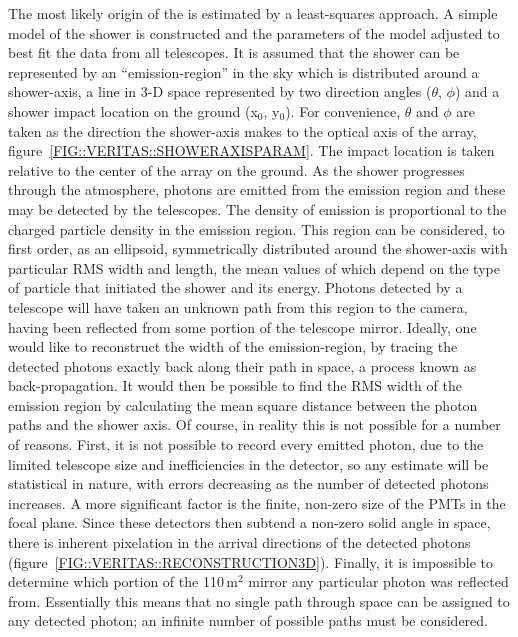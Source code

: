 The most likely origin of the \Gray is estimated by a least-squares
approach. A simple model of the shower is constructed and the
parameters of the model adjusted to best fit the data from all
telescopes. It is assumed that the shower can be represented by an
``emission-region'' in the sky which is distributed around a
shower-axis, a line in 3-D space represented by two direction angles
($\theta$, $\phi$) and a shower impact location on the ground (x$_0$,
y$_0$). For convenience, $\theta$ and $\phi$ are taken as the
direction the shower-axis makes to the optical axis of the array,
figure~\ref{FIG::VERITAS::SHOWERAXISPARAM}. The impact location is
taken relative to the center of the array on the ground. As the shower
progresses through the atmosphere, \Cerenkov photons are emitted from
the emission region and these may be detected by the telescopes. The
density of \Cerenkov emission is proportional to the charged particle
density in the emission region. This region can be considered, to
first order, as an ellipsoid, symmetrically distributed around the
shower-axis with particular RMS width and length, the mean values of
which depend on the type of particle that initiated the shower and its
energy. Photons detected by a telescope will have taken an unknown
path from this region to the camera, having been reflected from some
portion of the telescope mirror. Ideally, one would like to
reconstruct the width of the emission-region, by tracing the detected
photons exactly back along their path in space, a process known as
back-propagation. It would then be possible to find the RMS width of
the emission region by calculating the mean square distance between
the photon paths and the shower axis. Of course, in reality this is
not possible for a number of reasons. First, it is not possible to
record every emitted photon, due to the limited telescope size and
inefficiencies in the detector, so any estimate will be statistical in
nature, with errors decreasing as the number of detected photons
increases. A more significant factor is the finite, non-zero size of
the PMTs in the focal plane. Since these detectors then subtend a
non-zero solid angle in space, there is inherent pixelation in the
arrival directions of the detected photons
(figure~\ref{FIG::VERITAS::RECONSTRUCTION3D}). Finally, it is
impossible to determine which portion of the 110\,m$^2$ mirror any
particular photon was reflected from. Essentially this means that no
single path through space can be assigned to any detected \Cerenkov
photon; an infinite number of possible paths must be considered.

